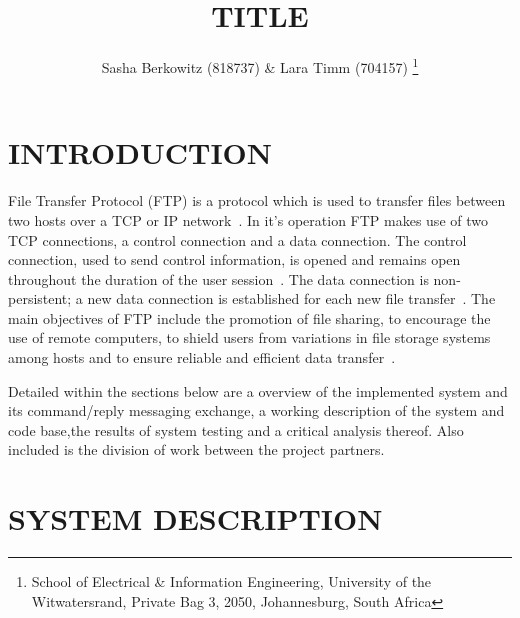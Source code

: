\documentclass[10pt,twocolumn]{witseiepaper}
\begin{document}
\title{TITLE}

\author{Sasha Berkowitz (818737) \& Lara Timm (704157)
\thanks{School of Electrical \& Information Engineering, University of the
Witwatersrand, Private Bag 3, 2050, Johannesburg, South Africa}
}


%
\abstract{}

\keywords{}

\maketitle
\pagestyle{plain}
\setcounter{page}{1}


\section{INTRODUCTION}

File Transfer Protocol (FTP) is a protocol which is used  to transfer files between two hosts over a TCP or IP network~\cite{FTPbeginners}. In it's operation FTP makes use of two TCP connections, a control connection and a data connection. The control connection, used to send control information, is opened and remains open throughout the duration of the user session~\cite{topDownApproach6th}. The data connection is non-persistent; a new data connection is established for each new file transfer~\cite{topDownApproach6th}. The main objectives of FTP include the promotion of file sharing, to encourage the use of remote computers, to shield users from variations in file storage systems among hosts and to ensure reliable and efficient data transfer~\cite{rfc959}. 


Detailed within the sections below are a overview of the implemented system and its command/reply messaging exchange, a working description of the system and code base,the results of system testing and a critical analysis thereof. Also included is the division of work between the project partners.

\section{SYSTEM DESCRIPTION} 
\end{document}
